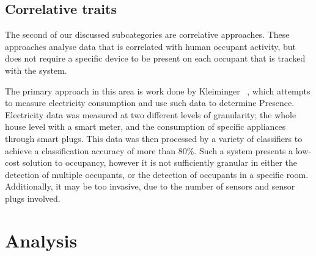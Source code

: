 \documentclass[../thesis/thesis.tex]{subfiles}
\begin{document}
\subsection{Correlative traits}
\label{subsubsec:litreview:sensors:extrinsic:correlative}
The second of our discussed subcategories are correlative approaches. These approaches analyse data that is correlated with human occupant activity, but does not require a specific device to be present on each occupant that is tracked with the system.

The primary approach in this area is work done by Kleiminger \etal~\cite{kleiminger2013occupancy}, which attempts to measure electricity consumption and use such data to determine Presence. Electricity data was measured at two different levels of granularity; the whole house level with a smart meter, and the consumption of specific appliances through smart plugs. This data was then processed by a variety of classifiers to achieve a classification accuracy of more than 80\%. Such a system presents a low-cost solution to occupancy, however it is not sufficiently granular in either the detection of multiple occupants, or the detection of occupants in a specific room. Additionally, it may be too invasive, due to the number of sensors and sensor plugs involved.

\section{Analysis}
\label{sec:litreview:sensors:analysis}
\end{document}
